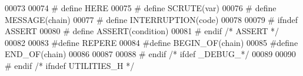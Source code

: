 \begin{DoxyCode}
00073 
00074 \textcolor{preprocessor}{# define HERE}
00075 \textcolor{preprocessor}{# define SCRUTE(var)}
00076 \textcolor{preprocessor}{# define MESSAGE(chain)}
00077 \textcolor{preprocessor}{# define INTERRUPTION(code)}
00078 
00079 \textcolor{preprocessor}{# ifndef ASSERT}
00080 \textcolor{preprocessor}{# define ASSERT(condition)}
00081 \textcolor{preprocessor}{# endif }\textcolor{comment}{/* ASSERT */}\textcolor{preprocessor}{}
00082 
00083 \textcolor{preprocessor}{#define REPERE}
00084 \textcolor{preprocessor}{#define BEGIN\_OF(chain)}
00085 \textcolor{preprocessor}{#define END\_OF(chain)}
00086 
00087 
00088 \textcolor{preprocessor}{# endif }\textcolor{comment}{/* ifdef \_DEBUG\_*/}\textcolor{preprocessor}{}
00089 
00090 \textcolor{preprocessor}{# endif }\textcolor{comment}{/* ifndef UTILITIES\_H */}\textcolor{preprocessor}{}
\end{DoxyCode}
